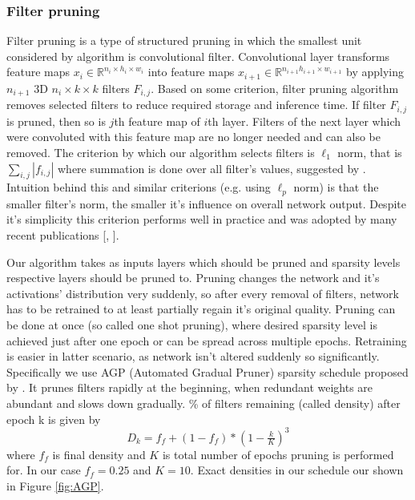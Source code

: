 \documentclass[../Main.tex]{subfiles}
\begin{document}
    \subsubsection{Filter pruning} 
    Filter pruning is a type of structured pruning in which the smallest unit considered by
    algorithm is convolutional filter. Convolutional layer transforms feature maps
    $x_i \in \mathbb{R}^{n_i \times h_i\times w_i}$ into
    feature maps  $x_{i+1} \in \mathbb{R}^{n_{i+1}h_{i+1} \times w_{i+1}}$ by applying
    $n_{i+1}$ 3D $n_i \times k \times k$ filters $F_{i,j}$. Based on some criterion, filter pruning 
    algorithm removes selected filters to reduce required storage and inference time.
    If filter $F_{i,j}$ is pruned, then so is $j$th feature map of $i$th layer. 
    Filters of the next layer which were convoluted with this feature map are no longer needed 
    and can also be removed. 
    The criterion by which our algorithm selects filters is  
    $\ell_1$ norm, that is $\sum_{i,j}|f_{i,j}|$ where summation is done
    over all filter's values, suggested by \cite{li2016pruning}.
    Intuition behind this and similar criterions (e.g. using 
    $\ell_p$ norm) is that the smaller filter's norm, the smaller it's influence 
    on overall network output. Despite it's simplicity this criterion performs well in practice
    and was adopted by many recent publications [\cite{lottery1}, \cite{lottery2}].
    
    Our algorithm takes as inputs layers which should be pruned and sparsity levels
    respective layers should be pruned to. Pruning changes the network and it's activations' distribution
    very suddenly, so after every removal of filters, network has to be retrained to 
    at least partially regain it's original quality. Pruning can be done at once 
    (so called one shot pruning), 
    where desired sparsity level is achieved just after one epoch or can be 
    spread across multiple epochs.  Retraining is easier in latter scenario,
    as network isn't altered suddenly so significantly. Specifically we use AGP (Automated
    Gradual Pruner) sparsity schedule proposed by \cite{zhu2017prune}. It prunes
    filters rapidly at the beginning, when redundant weights are abundant
    and slows down gradually. \% of filters remaining (called density) after epoch 
    k is given by
    \[ D_k = f_f + (1-f_f)*(1-\tfrac{k}{K})^3 \]
    where $f_f$ is final density and $K$ is total number of epochs
    pruning is performed for. In our case $f_f=0.25$ and $K=10$. Exact densities
    in our schedule our shown in Figure \ref{fig:AGP}. 
    
\end{document}
